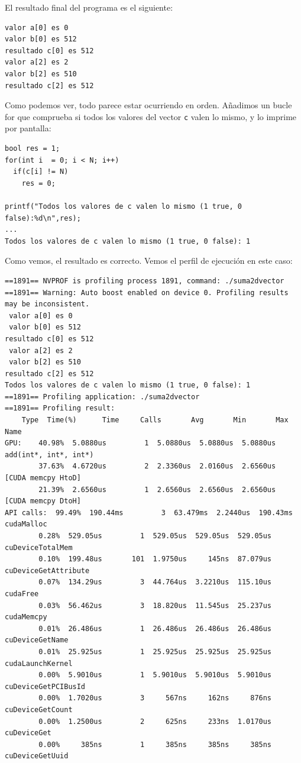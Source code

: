 \documentclass[11pt]{article}
\def\inline{\lstinline[basicstyle=\ttfamily,keywordstyle={}]}
\begin{document}
El resultado final del programa es el siguiente:

\begin{verbatim}
valor a[0] es 0
valor b[0] es 512
resultado c[0] es 512
valor a[2] es 2
valor b[2] es 510
resultado c[2] es 512	
\end{verbatim}

Como podemos ver, todo parece estar ocurriendo en orden. Añadimos un bucle for que comprueba si todos los valores del vector \inline{c} valen lo mismo, y lo imprime por pantalla:

\begin{verbatim}
bool res = 1;
for(int i  = 0; i < N; i++)
  if(c[i] != N)
	res = 0;

printf("Todos los valores de c valen lo mismo (1 true, 0 false):%d\n",res);
... 
Todos los valores de c valen lo mismo (1 true, 0 false): 1
\end{verbatim}

Como vemos, el resultado es correcto. Vemos el perfil de ejecución en este caso:

\begin{verbatim}
==1891== NVPROF is profiling process 1891, command: ./suma2dvector
==1891== Warning: Auto boost enabled on device 0. Profiling results may be inconsistent.
 valor a[0] es 0
 valor b[0] es 512
resultado c[0] es 512
 valor a[2] es 2
 valor b[2] es 510
resultado c[2] es 512
Todos los valores de c valen lo mismo (1 true, 0 false): 1
==1891== Profiling application: ./suma2dvector
==1891== Profiling result:
	Type  Time(%)      Time     Calls       Avg       Min       Max  Name
GPU:    40.98%  5.0880us         1  5.0880us  5.0880us  5.0880us  add(int*, int*, int*)
        37.63%  4.6720us         2  2.3360us  2.0160us  2.6560us  [CUDA memcpy HtoD]
        21.39%  2.6560us         1  2.6560us  2.6560us  2.6560us  [CUDA memcpy DtoH]
API calls:  99.49%  190.44ms         3  63.479ms  2.2440us  190.43ms  cudaMalloc
		0.28%  529.05us         1  529.05us  529.05us  529.05us  cuDeviceTotalMem
		0.10%  199.48us       101  1.9750us     145ns  87.079us  cuDeviceGetAttribute
		0.07%  134.29us         3  44.764us  3.2210us  115.10us  cudaFree
		0.03%  56.462us         3  18.820us  11.545us  25.237us  cudaMemcpy
		0.01%  26.486us         1  26.486us  26.486us  26.486us  cuDeviceGetName
		0.01%  25.925us         1  25.925us  25.925us  25.925us  cudaLaunchKernel
		0.00%  5.9010us         1  5.9010us  5.9010us  5.9010us  cuDeviceGetPCIBusId
		0.00%  1.7020us         3     567ns     162ns     876ns  cuDeviceGetCount
		0.00%  1.2500us         2     625ns     233ns  1.0170us  cuDeviceGet
		0.00%     385ns         1     385ns     385ns     385ns  cuDeviceGetUuid
\end{verbatim}
\end{document}
